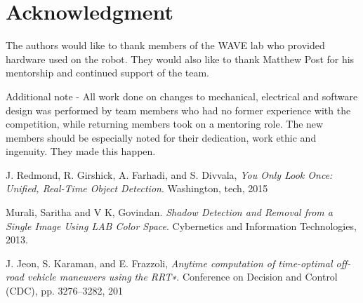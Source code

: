 \documentclass[11pt,journal]{IEEEtran}
\begin{document}
\section*{Acknowledgment}

The authors would like to thank members of the WAVE lab who provided hardware used on the robot. They would also like to thank Matthew Post for his mentorship and continued support of the team.

Additional note - All work done on changes to mechanical, electrical and software design was performed by team members who had no former experience with the competition, while returning members took on a mentoring role. The new members should be especially noted for their dedication, work ethic and ingenuity. They made this happen.

\ifCLASSOPTIONcaptionsoff
  \newpage
\fi





%
%
%
\begin{thebibliography}{2}

J. Redmond, R. Girshick, A. Farhadi, and S. Divvala, \emph{You Only Look Once: Unified, Real-Time Object Detection}. Washington, tech, 2015

Murali, Saritha and V K, Govindan. \emph{Shadow Detection and Removal from a Single Image Using LAB Color Space}. Cybernetics and Information Technologies, 2013. 

J. Jeon, S. Karaman, and E. Frazzoli, \emph{Anytime computation of time-optimal off-road vehicle maneuvers using the RRT∗}. Conference
on Decision and Control (CDC), pp. 3276–3282, 201
\end{thebibliography}
\end{document}
